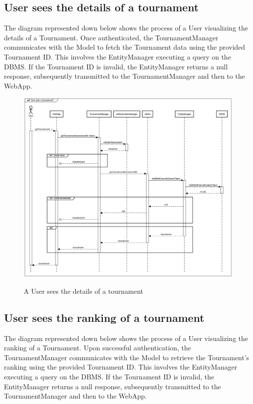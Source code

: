 \documentclass{Configuration_Files/Template}
\begin{document}
\subsection*{User sees the details of a tournament}

The diagram represented down below shows the process of a User visualizing the details of a Tournament. Once authenticated, the TournamentManager communicates with the Model to fetch the Tournament data using the provided Tournament ID. This involves the EntityManager executing a query on the DBMS. If the Tournament ID is invalid, the EntityManager returns a null response, subsequently transmitted to the TournamentManager and then to the WebApp.

\begin{figure}[H]
\centering
\includegraphics[scale = 0.33]{Images/diagrams/sequences/GetTournament.png}\\
\caption{A User sees the details of a tournament}
\end{figure}

\subsection*{User sees the ranking of a tournament}

The diagram represented down below shows the process of a User visualizing the ranking of a Tournament. Upon successful authentication, the TournamentManager communicates with the Model to retrieve the Tournament's ranking using the provided Tournament ID. This involves the EntityManager executing a query on the DBMS. If the Tournament ID is invalid, the EntityManager returns a null response, subsequently transmitted to the TournamentManager and then to the WebApp.
\end{document}

